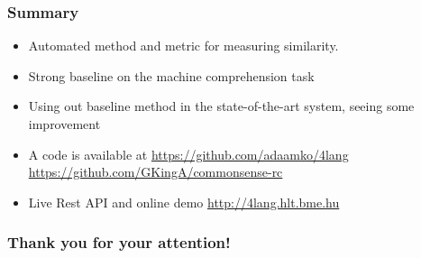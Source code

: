 \documentclass[bigger]{beamer}
\begin{document}
\begin{frame}
\frametitle{Summary}
	\begin{itemize}
	    \pause \item Automated method and metric for measuring similarity.
	    \pause \item Strong baseline on the machine comprehension task
	    \pause \item Using out baseline method in the state-of-the-art system, seeing some improvement
	    \pause \item A code is available at \url{https://github.com/adaamko/4lang} \\ \url{https://github.com/GKingA/commonsense-rc}
	    \pause \item Live Rest API and online demo \url{http://4lang.hlt.bme.hu}
	\end{itemize}

\end{frame}
\begin{frame}
    \frametitle{Thank you for your attention!}
    \AtNextBibliography{\tiny}
    \printbibliography
\end{frame}
\end{document}
